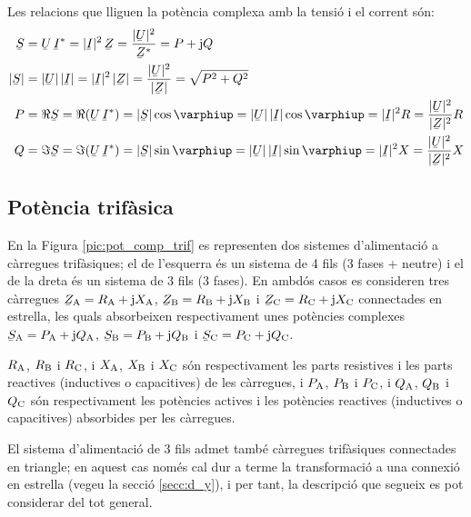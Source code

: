 Les relacions que lliguen la potència complexa amb la tensió i el corrent són:
\begin{align}
   \cmplx{S} &=  \cmplx{U} \,\cmplx{I}^* =
   |\cmplx{I}|^2 \,\cmplx{Z} = \frac{|\cmplx{U}|^2}{\cmplx{Z}^*} =
   P + \ju Q \label{eq:s_mono1}\\
   |\cmplx{S}| &= |\cmplx{U}| \,|\cmplx{I}| =
   |\cmplx{I}|^2 \,|\cmplx{Z}| = \frac{|\cmplx{U}|^2}{|\cmplx{Z}|} =
   \sqrt{P^2+Q^2} \\
   P &= \Re\cmplx{S} = \Re (\cmplx{U} \, \cmplx{I}^*) = |\cmplx{S}| \cos\varphiup =
   |\cmplx{U}|\, |\cmplx{I}| \cos\varphiup = |\cmplx{I}|^2 R =
   \frac{|\cmplx{U}|^2}{|\cmplx{Z}|^2}R\\
   Q &= \Im\cmplx{S} = \Im (\cmplx{U} \, \cmplx{I}^*) = |\cmplx{S}| \sin\varphiup =
   |\cmplx{U}| \,|\cmplx{I}|\sin\varphiup  = |\cmplx{I}|^2 X =
   \frac{|\cmplx{U}|^2}{|\cmplx{Z}|^2}X
\end{align}

\subsection{Potència trifàsica}  \label{sec:pot-trif}

En la Figura \vref{pic:pot_comp_trif} es representen dos sistemes
d'alimentació a càrregues trifàsiques; el de l'esquerra és un
sistema de 4 fils (3 fases + neutre) i el de la dreta és un sistema
de 3 fils (3 fases). En ambdós casos es consideren tres càrregues
$\cmplx{Z}\ped{A} = R\ped{A} + \ju X\ped{A}$, $\cmplx{Z}\ped{B}=
R\ped{B} + \ju X\ped{B}$ i $\cmplx{Z}\ped{C}= R\ped{C} + \ju X\ped{C}$
connectades en estrella, les quals absorbeixen respectivament unes
potències complexes $\cmplx{S}\ped{A} = P\ped{A} + \ju Q\ped{A}$,
$\cmplx{S}\ped{B}= P\ped{B} + \ju Q\ped{B}$ i $\cmplx{S}\ped{C}=
P\ped{C} + \ju Q\ped{C}$.

$R_\mathrm{A}$, $R_\mathrm{B}$ i $R_\mathrm{C}$, i $X_\mathrm{A}$, $X_\mathrm{B}$ i
$X_\mathrm{C}$ són respectivament les parts resistives i les parts
reactives (inductives o capacitives) de les càrregues, i $P_\mathrm{A}$,
$P_\mathrm{B}$ i $P_\mathrm{C}$, i $Q_\mathrm{A}$, $Q_\mathrm{B}$ i $Q_\mathrm{C}$ són
respectivament les potències actives i les potències reactives
(inductives o capacitives) absorbides per les càrregues.

El sistema d'alimentació de 3 fils admet també càrregues
trifàsiques connectades en triangle; en aquest cas només cal dur a
terme la transformació a una connexió en estrella (vegeu la secció
\ref{secc:d_y}), i per tant, la descripció que segueix es pot
considerar del tot general.


